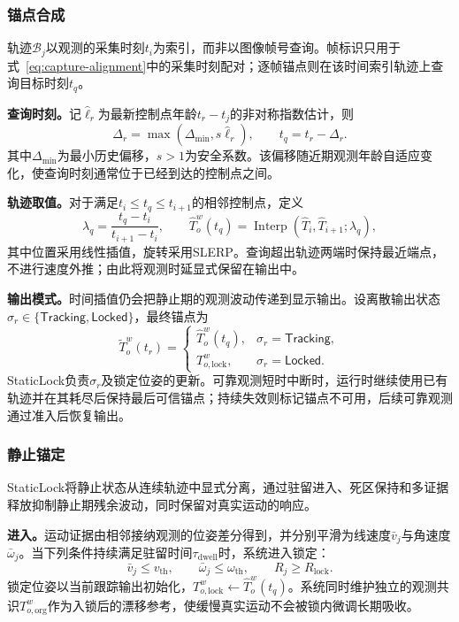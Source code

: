 \documentclass[review]{vgtc}
\begin{document}
\subsubsection{锚点合成}\label{sec:frame-output}

轨迹$\mathcal B_j$以观测的采集时刻$t_i$为索引，而非以图像帧号查询。帧标识只用于式~\eqref{eq:capture-alignment}中的采集时刻配对；逐帧锚点则在该时间索引轨迹上查询目标时刻$t_q$。

\textbf{查询时刻。}记$\widehat\ell_r$为最新控制点年龄$t_r-t_j$的非对称指数估计，则
\begin{equation}
\Delta_r=\max(\Delta_{\min},s\widehat\ell_r),\qquad
t_q=t_r-\Delta_r.
\label{eq:target-time}
\end{equation}
其中$\Delta_{\min}$为最小历史偏移，$s>1$为安全系数。该偏移随近期观测年龄自适应变化，使查询时刻通常位于已经到达的控制点之间。

\textbf{轨迹取值。}对于满足$t_i\le t_q\le t_{i+1}$的相邻控制点，定义
\begin{equation}
\lambda_q=\frac{t_q-t_i}{t_{i+1}-t_i},\qquad
\widehat T_o^w(t_q)=
\operatorname{Interp}(\widehat T_i,\widehat T_{i+1};\lambda_q),
\label{eq:delayed-interp}
\end{equation}
其中位置采用线性插值，旋转采用SLERP。查询超出轨迹两端时保持最近端点，不进行速度外推；由此将观测时延显式保留在输出中。

\textbf{输出模式。}时间插值仍会把静止期的观测波动传递到显示输出。设离散输出状态$\sigma_r\in\{\mathsf{Tracking},\mathsf{Locked}\}$，最终锚点为
\begin{equation}
\widetilde T_o^w(t_r)=
\begin{cases}
\widehat T_o^w(t_q), & \sigma_r=\mathsf{Tracking},\\
T_{o,\mathrm{lock}}^w, & \sigma_r=\mathsf{Locked}.
\end{cases}
\label{eq:staticlock}
\end{equation}
StaticLock负责$\sigma_r$及锁定位姿的更新。可靠观测短时中断时，运行时继续使用已有轨迹并在其耗尽后保持最后可信锚点；持续失效则标记锚点不可用，后续可靠观测通过准入后恢复输出。

\subsubsection{静止锚定}\label{sec:staticlock}

StaticLock将静止状态从连续轨迹中显式分离，通过驻留进入、死区保持和多证据释放抑制静止期残余波动，同时保留对真实运动的响应。

\textbf{进入。}运动证据由相邻接纳观测的位姿差分得到，并分别平滑为线速度$\bar v_j$与角速度$\bar\omega_j$。当下列条件持续满足驻留时间$\tau_{\mathrm{dwell}}$时，系统进入锁定：
\begin{equation}
\bar v_j\le v_{\mathrm{th}},\qquad
\bar\omega_j\le\omega_{\mathrm{th}},\qquad
R_j\ge R_{\mathrm{lock}}.
\label{eq:lock-entry}
\end{equation}
锁定位姿以当前跟踪输出初始化，$T_{o,\mathrm{lock}}^w\leftarrow\widehat T_o^w(t_q)$。系统同时维护独立的观测共识$T_{o,\mathrm{org}}^w$作为入锁后的漂移参考，使缓慢真实运动不会被锁内微调长期吸收。
\end{document}

